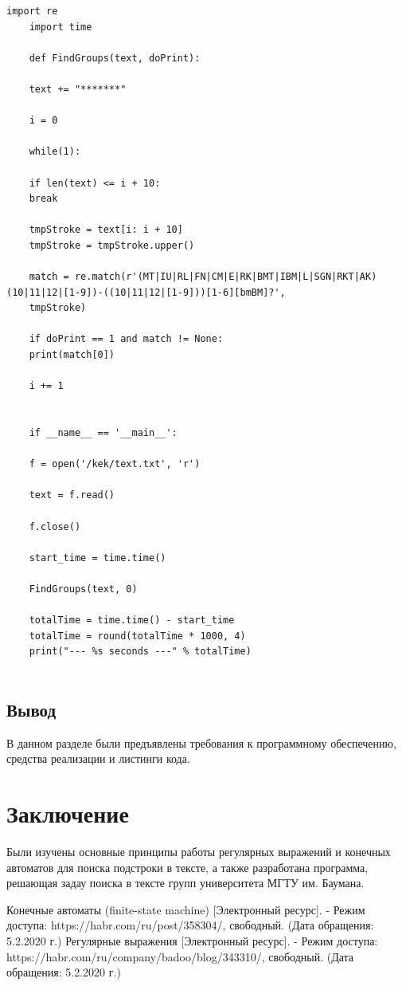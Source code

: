 \documentclass[12pt, a4paper]{report}
\begin{document}
	\begin{lstlisting}[label=code:regular,caption=Реализация регулярного выражения]
	import re
	import time
	
	def FindGroups(text, doPrint):
	
	text += "*******"
	
	i = 0
	
	while(1):
	
	if len(text) <= i + 10:
	break
	
	tmpStroke = text[i: i + 10]
	tmpStroke = tmpStroke.upper()
	
	match = re.match(r'(MT|IU|RL|FN|CM|E|RK|BMT|IBM|L|SGN|RKT|AK)(10|11|12|[1-9])-((10|11|12|[1-9]))[1-6][bmBM]?',
	tmpStroke)
	
	if doPrint == 1 and match != None:
	print(match[0])
	
	i += 1
	
	
	if __name__ == '__main__':
	
	f = open('/kek/text.txt', 'r')
	
	text = f.read()
	
	f.close()
	
	start_time = time.time()
	
	FindGroups(text, 0)
	
	totalTime = time.time() - start_time
	totalTime = round(totalTime * 1000, 4)
	print("--- %s seconds ---" % totalTime)
	
	\end{lstlisting}

	\newpage

	\section{Вывод}
	В данном разделе были предъявлены требования к программному обеспечению, средства реализации и листинги кода.


	\newpage

	\chapter*{Заключение}
	Были изучены основные принципы работы регулярных выражений и конечных автоматов для поиска подстроки в тексте, а также разработана программа, решающая задау поиска в тексте групп университета МГТУ им. Баумана.
	
	\newpage
	
	\begin{thebibliography}{}
	Конечные автоматы (finite-state machine) [Электронный ресурс]. - Режим доступа: https://habr.com/ru/post/358304/, свободный. (Дата обращения: 5.2.2020 г.)
	Регулярные выражения [Электронный ресурс]. - Режим доступа: https://habr.com/ru/company/badoo/blog/343310/, свободный. (Дата обращения: 5.2.2020 г.)
	\end{thebibliography}
\end{document}
